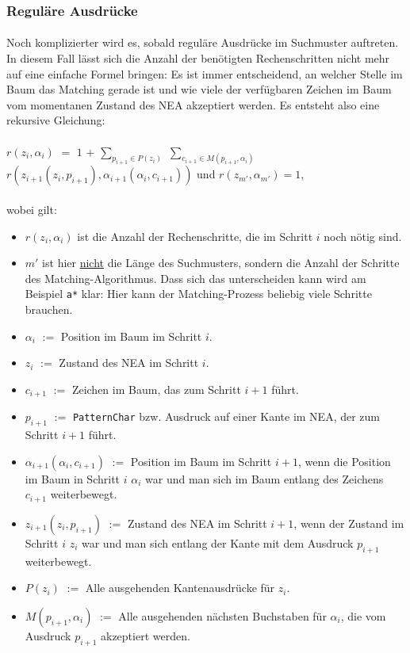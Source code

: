 \subsubsection{Reguläre Ausdrücke}

\paragraph{} Noch komplizierter wird es, sobald reguläre Ausdrücke im Suchmuster auftreten. In diesem Fall lässt sich die Anzahl der benötigten Rechenschritten nicht mehr auf eine einfache Formel bringen: Es ist immer entscheidend, an welcher Stelle im Baum das Matching gerade ist und wie viele der verfügbaren Zeichen im Baum vom momentanen Zustand des NEA akzeptiert werden. Es entsteht also eine rekursive Gleichung:
\paragraph{} $r(z_i,\alpha_i)$ $=$ $1$ $+$ 
$\sum_{p_{i+1} \in P(z_i)}$ 
$\sum_{c_{i+1} \in M(p_{i+1}, \alpha_i)}$ 
$ r\left(z_{i+1}(z_i,p_{i+1}),\alpha_{i+1}(\alpha_i,c_{i+1})\right)$ und $r(z_{m'},\alpha_{m'}) = 1$,
\paragraph{}wobei gilt:
\begin{itemize}
 \item $r(z_i,\alpha_i)$ ist die Anzahl der Rechenschritte, die im Schritt $i$ noch nötig sind.
 \item ${m'}$ ist hier \underline{nicht} die Länge des Suchmusters, sondern die Anzahl der Schritte des Matching-Algorithmus. Dass sich das unterscheiden kann wird am Beispiel \texttt{a*} klar: Hier kann der Matching-Prozess beliebig viele Schritte brauchen.
 \item $\alpha_i$ $:=$ Position im Baum im Schritt $i$.
 \item $z_i$ $:=$ Zustand des NEA im Schritt $i$.
 \item $c_{i+1}$ $:=$ Zeichen im Baum, das zum Schritt $i+1$ führt.
 \item $p_{i+1}$ $:=$ \texttt{PatternChar} bzw. Ausdruck auf einer Kante im NEA, der zum Schritt $i+1$ führt.
 \item $\alpha_{i+1}(\alpha_i,c_{i+1})$ $:=$ Position im Baum im Schritt $i+1$, wenn die Position im Baum in Schritt $i$ $\alpha_i$ war und man sich im Baum entlang des Zeichens $c_{i+1}$ weiterbewegt.
 \item $z_{i+1}(z_i,p_{i+1})$ $:=$ Zustand des NEA im Schritt $i+1$, wenn der Zustand im Schritt $i$ $z_i$ war und man sich entlang der Kante mit dem Ausdruck $p_{i+1}$ weiterbewegt.
 \item $P(z_i)$ $:=$ Alle ausgehenden Kantenausdrücke für $z_i$.
 \item $M(p_{i+1},\alpha_i)$ $:=$ Alle ausgehenden nächsten Buchstaben für $\alpha_i$, die vom Ausdruck $p_{i+1}$ akzeptiert werden.
\end{itemize}

